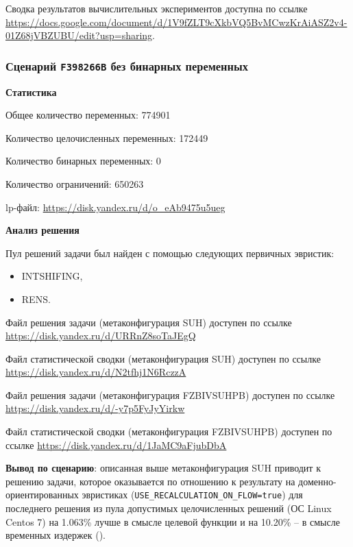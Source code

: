 \documentclass[%
	11pt,
	a4paper,
	utf8,
		]{article}
\begin{document}
Сводка результатов вычислительных экспериментов доступна по ссылке \url{https://docs.google.com/document/d/1V9fZLT9cXkbVQ5BvMCwzKrAiASZ2v4-01Z68jVBZUBU/edit?usp=sharing}.

\subsubsection{Сценарий \texttt{F398266B} без бинарных переменных}

\textbf{Статистика}\vspace*{1mm}

Общее количество переменных: 774901

Количество целочисленных переменных: 172449

Количество бинарных переменных: 0

Количество ограничений: 650263

lp-файл: \url{https://disk.yandex.ru/d/o_eAb9475u5ueg}

\vspace*{5mm}\textbf{Анализ решения}\vspace*{1mm}

Пул решений задачи был найден с помощью следующих первичных эвристик:
\begin{itemize}
	\item INTSHIFING,
	
	\item RENS.
\end{itemize}

Файл решения задачи (метаконфигурация SUH) доступен по ссылке \url{https://disk.yandex.ru/d/URRnZ8soTaJEgQ}

Файл статистической сводки (метаконфигурация SUH) доступен по ссылке \url{https://disk.yandex.ru/d/N2tfhj1N6RczzA}

Файл решения задачи (метаконфигурация FZBIVSUHPB) доступен по ссылке \url{https://disk.yandex.ru/d/-y7p5FyJyYirkw}

Файл статистической сводки (метаконфигурация FZBIVSUHPB) доступен по ссылке \url{https://disk.yandex.ru/d/1JaMC9aFjubDbA}

\vspace*{3mm}
\textbf{Вывод по сценарию}: описанная выше метаконфигурация SUH приводит к решению задачи, которое оказывается по отношению к результату на доменно-ориентированных эвристиках (\verb|USE_RECALCULATION_ON_FLOW=true|) для последнего решения из пула допустимых целочисленных решений (ОС Linux Centos 7) на 1.063\% лучше в смысле целевой функции и на 10.20\% -- в смысле временных издержек (). 
\end{document}
